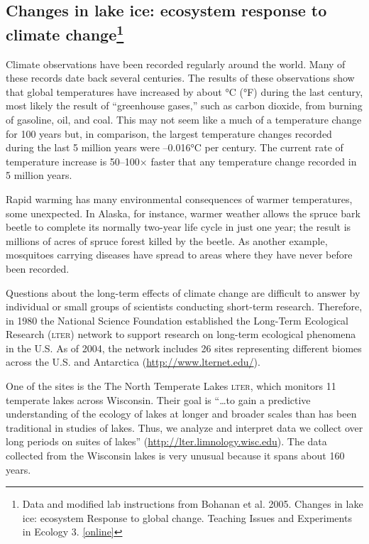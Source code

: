 \documentclass[12pt, hidelinks]{exam}
\begin{document}
\subsection*{Changes in lake ice: ecosystem response to climate
change\footnote{\raggedright Data and modified lab instructions from Bohanan et al. 2005. Changes in lake ice: ecosystem Response to global change. Teaching Issues and Experiments in Ecology 3. \href{http://www.esa.org/tiee/vol/v3/issues/data_sets/lake_ice/abstract.html}{[online]}}}

Climate observations have been recorded regularly around the world. Many of
these records date back several centuries. The results of these observations
show that global temperatures
have increased by about {}°C ({}°F) during the last century,
most likely the result of ``greenhouse gases,'' such as carbon dioxide,
from burning of gasoline, oil, and coal. This may not seem like a
much of a temperature change for 100 years but, in comparison, 
the largest temperature changes recorded during the last 5 million years were 
{–0.016}°C per century. The current rate of temperature increase is 
50–100$\times$ faster that any temperature change recorded in 5 million years.

Rapid warming has many environmental consequences of warmer temperatures, some
unexpected. In Alaska, for instance, warmer weather allows the spruce
bark beetle to complete its normally two-year life cycle in just one
year; the result is millions of acres of spruce forest killed by the
beetle. As another example, mosquitoes carrying diseases have spread to
areas where they have never before been recorded.


Questions about the long-term effects of climate change are difficult
to answer by individual or small groups of scientists conducting
short-term research. Therefore, in 1980 the National Science Foundation
established the Long-Term Ecological Research (\textsc{lter}) network to support
research on long-term ecological phenomena in the U.S. 
As of 2004, the network includes 26 sites representing different biomes across the
U.S. and Antarctica (\url{http://www.lternet.edu/}).

One of the sites is the The North Temperate Lakes \textsc{lter},
which monitors 11 temperate lakes across Wisconsin. Their goal  is “\dots to gain a
predictive understanding of the ecology of lakes at longer and broader
scales than has been traditional in studies of lakes. Thus, we analyze and
interpret data we collect over long periods on suites of lakes”
(\url{http://lter.limnology.wisc.edu}). The data collected
from the Wisconsin lakes is very unusual
because it spans about 160 years.
\end{document}
